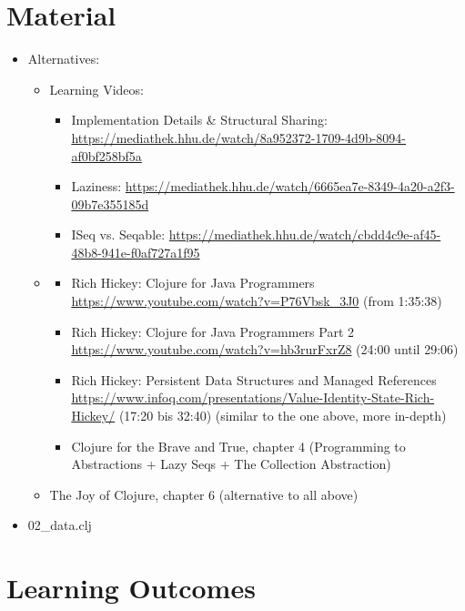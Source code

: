 \documentclass[11pt,a4paper]{article}
\begin{document}
	

\section{Material} 

\begin{itemize}
    \item Alternatives:
        \begin{itemize}
\item Learning Videos:
    \begin{itemize}
        \item Implementation Details \& Structural Sharing: \url{https://mediathek.hhu.de/watch/8a952372-1709-4d9b-8094-af0bf258bf5a}
        \item Laziness: \url{https://mediathek.hhu.de/watch/6665ea7e-8349-4a20-a2f3-09b7e355185d}
        \item ISeq vs. Seqable: \url{https://mediathek.hhu.de/watch/cbdd4c9e-af45-48b8-941e-f0af727a1f95}
    \end{itemize}
            \item 
                \begin{itemize}
\item Rich Hickey: Clojure for Java Programmers \url{https://www.youtube.com/watch?v=P76Vbsk_3J0} (from 1:35:38)
\item Rich Hickey: Clojure for Java Programmers Part 2 \url{https://www.youtube.com/watch?v=hb3rurFxrZ8} (24:00 until 29:06)
\item Rich Hickey: Persistent Data Structures and Managed References \url{https://www.infoq.com/presentations/Value-Identity-State-Rich-Hickey/} (17:20 bis 32:40) (similar to the one above, more in-depth)
\item Clojure for the Brave and True, chapter 4 (Programming to Abstractions + Lazy Seqs + The Collection Abstraction)
                \end{itemize}
\item The Joy of Clojure, chapter 6 (alternative to all above)
        \end{itemize}
\item 02\_data.clj
\end{itemize}


\section{Learning Outcomes}
\end{document}
